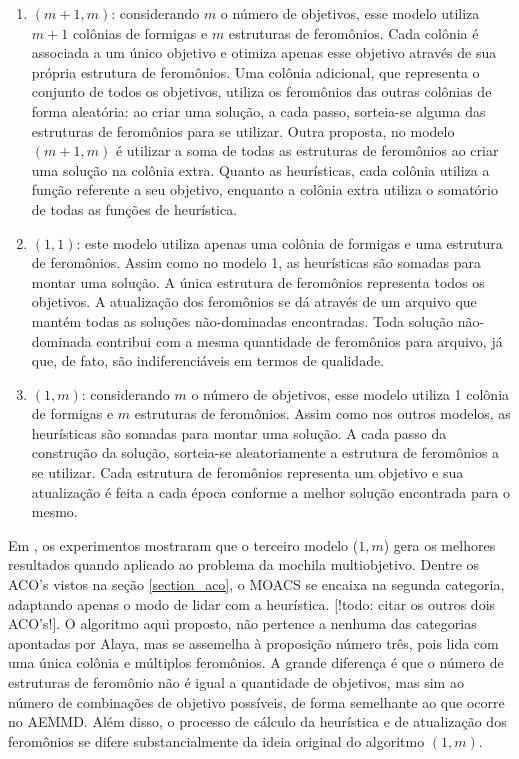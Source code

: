 \begin{enumerate}
	\item $(m+1, m)$: considerando $m$ o número de objetivos, esse modelo utiliza $m + 1$ colônias de formigas e $m$ estruturas de feromônios. Cada colônia é associada a um único objetivo e otimiza apenas esse objetivo através de sua própria estrutura de feromônios. Uma colônia adicional, que representa o conjunto de todos os objetivos, utiliza os feromônios das outras colônias de forma aleatória: ao criar uma solução, a cada passo, sorteia-se alguma das estruturas de feromônios para se utilizar. Outra proposta, no modelo $(m+1, m)$ é utilizar a soma de todas as estruturas de feromônios ao criar uma solução na colônia extra. Quanto as heurísticas, cada colônia utiliza a função referente a seu objetivo, enquanto a colônia extra utiliza o somatório de todas as funções de heurística.
	\item $(1,1)$: este modelo utiliza apenas uma colônia de formigas e uma estrutura de feromônios. Assim como no modelo 1, as heurísticas são somadas para montar uma solução. A única estrutura de feromônios representa todos os objetivos. A atualização dos feromônios se dá através de um arquivo que mantém todas as soluções não-dominadas encontradas. Toda solução não-dominada contribui com a mesma quantidade de feromônios para arquivo, já que, de fato, são indiferenciáveis em termos de qualidade.
	\item $(1,m)$: considerando $m$ o número de objetivos, esse modelo utiliza 1 colônia de formigas e $m$ estruturas de feromônios. Assim como nos outros modelos, as heurísticas são somadas para montar uma solução. A cada passo da construção da solução, sorteia-se aleatoriamente a estrutura de feromônios a se utilizar. Cada estrutura de feromônios representa um objetivo e sua atualização é feita a cada época conforme a melhor solução encontrada para o mesmo.
\end{enumerate}

Em \cite{Alaya2007}, os experimentos mostraram que o terceiro modelo ($1,m$) gera os melhores resultados quando aplicado ao problema da mochila multiobjetivo. Dentre os ACO's vistos na seção \ref{section_aco}, o MOACS se encaixa na segunda categoria, adaptando apenas o modo de lidar com a heurística. [!todo: citar os outros dois ACO's!]. O algoritmo aqui proposto, não pertence a nenhuma das categorias apontadas por Alaya, mas se assemelha à proposição número três, pois lida com uma única colônia e múltiplos feromônios. A grande diferença é que o número de estruturas de feromônio não é igual a quantidade de objetivos, mas sim ao número de combinações de objetivo possíveis, de forma semelhante ao que ocorre no AEMMD. Além disso, o processo de cálculo da heurística e de atualização dos feromônios se difere substancialmente da ideia original do algoritmo $(1,m)$.

